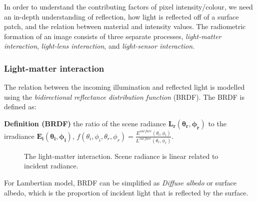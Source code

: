 In order to understand the contributing factors of pixel intensity/colour, we need an in-depth understanding of reflection, \ie how light is reflected off of a surface patch, and the relation between material and intensity values. The radiometric formation of an image consists of three separate processes, \textit{light-matter interaction}, \textit{light-lens interaction}, and \textit{light-sensor interaction}.

\subsubsection{Light-matter interaction}
The relation between the incoming illumination and reflected light is modelled using the \textit{bidirectional reflectance distribution function} (BRDF). The BRDF is defined as:

\noindent\textbf{Definition (BRDF)} the ratio of the scene radiance $\mathbf{L_r(\theta_r, \phi_r)}$ to the irradiance $\mathbf{E_i(\theta_i, \phi_i)}$, \ie $f(\theta_i, \phi_i, \theta_r, \phi_r)=\frac{E^{surface}(\theta_i, \phi_i)}{L^{surface}(\theta_r, \phi_r)}$.
\begin{figure}[!htbp]
\centering
{}
\caption{The light-matter interaction. Scene radiance is linear related to incident radiance.}
\label{fig:light_matter_interact}
\end{figure}

For Lambertian model, BRDF can be simplified as \textit{Diffuse albedo} or surface albedo, which is the proportion of incident light that is reflected by the surface. 

